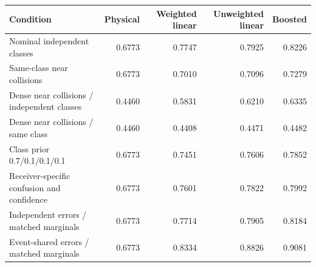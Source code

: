 \begin{tabularx}{\linewidth}{@{}Yrrrr@{}}\toprule
Condition & Physical & Weighted linear & Unweighted linear & Boosted \\\midrule
Nominal independent classes & 0.6773 & 0.7747 & 0.7925 & 0.8226 \\
Same-class near collisions & 0.6773 & 0.7010 & 0.7096 & 0.7279 \\
Dense near collisions / independent classes & 0.4460 & 0.5831 & 0.6210 & 0.6335 \\
Dense near collisions / same class & 0.4460 & 0.4408 & 0.4471 & 0.4482 \\
Class prior 0.7/0.1/0.1/0.1 & 0.6773 & 0.7451 & 0.7606 & 0.7852 \\
Receiver-specific confusion and confidence & 0.6773 & 0.7601 & 0.7822 & 0.7992 \\
Independent errors / matched marginals & 0.6773 & 0.7714 & 0.7905 & 0.8184 \\
Event-shared errors / matched marginals & 0.6773 & 0.8334 & 0.8826 & 0.9081 \\
\bottomrule\end{tabularx}
